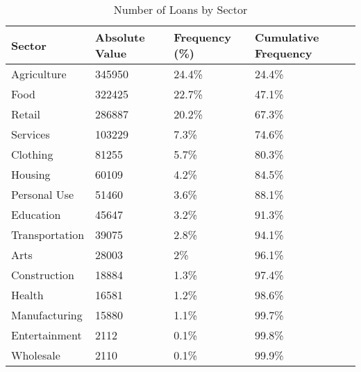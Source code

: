 \begin{table}[!htb]
\centering
\begin{tabular}{llll}
  \hline
Sector & Absolute Value & Frequency (\%) & Cumulative Frequency \\ 
  \hline
Agriculture & 345950 & 24.4\% & 24.4\% \\ 
  Food & 322425 & 22.7\% & 47.1\% \\ 
  Retail & 286887 & 20.2\% & 67.3\% \\ 
  Services & 103229 & 7.3\% & 74.6\% \\ 
  Clothing & 81255 & 5.7\% & 80.3\% \\ 
  Housing & 60109 & 4.2\% & 84.5\% \\ 
  Personal Use & 51460 & 3.6\% & 88.1\% \\ 
  Education & 45647 & 3.2\% & 91.3\% \\ 
  Transportation & 39075 & 2.8\% & 94.1\% \\ 
  Arts & 28003 & 2\% & 96.1\% \\ 
  Construction & 18884 & 1.3\% & 97.4\% \\ 
  Health & 16581 & 1.2\% & 98.6\% \\ 
  Manufacturing & 15880 & 1.1\% & 99.7\% \\ 
  Entertainment & 2112 & 0.1\% & 99.8\% \\ 
  Wholesale & 2110 & 0.1\% & 99.9\% \\ 
   \hline
\end{tabular}
\caption{Number of Loans by Sector} 
\label{tab:Loan_Sector}
\end{table}
